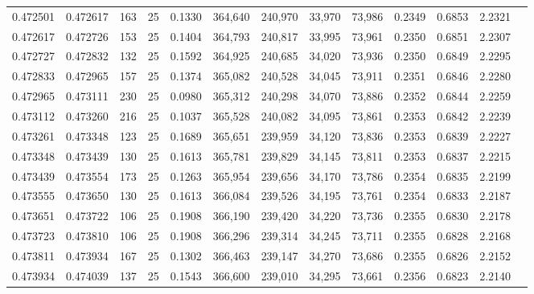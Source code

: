 \begin{tabular}{rrrrrrrrrrrrr}
0.472501 & 0.472617 &   163 &  25 &                                     0.1330 & 364,640 & 240,970 &  33,970 &  73,986 & 0.2349 & 0.6853 & 2.2321 \\
0.472617 & 0.472726 &   153 &  25 &                                     0.1404 & 364,793 & 240,817 &  33,995 &  73,961 & 0.2350 & 0.6851 & 2.2307 \\
0.472727 & 0.472832 &   132 &  25 &                                     0.1592 & 364,925 & 240,685 &  34,020 &  73,936 & 0.2350 & 0.6849 & 2.2295 \\
0.472833 & 0.472965 &   157 &  25 &                                     0.1374 & 365,082 & 240,528 &  34,045 &  73,911 & 0.2351 & 0.6846 & 2.2280 \\
0.472965 & 0.473111 &   230 &  25 &                                     0.0980 & 365,312 & 240,298 &  34,070 &  73,886 & 0.2352 & 0.6844 & 2.2259 \\
0.473112 & 0.473260 &   216 &  25 &                                     0.1037 & 365,528 & 240,082 &  34,095 &  73,861 & 0.2353 & 0.6842 & 2.2239 \\
0.473261 & 0.473348 &   123 &  25 &                                     0.1689 & 365,651 & 239,959 &  34,120 &  73,836 & 0.2353 & 0.6839 & 2.2227 \\
0.473348 & 0.473439 &   130 &  25 &                                     0.1613 & 365,781 & 239,829 &  34,145 &  73,811 & 0.2353 & 0.6837 & 2.2215 \\
0.473439 & 0.473554 &   173 &  25 &                                     0.1263 & 365,954 & 239,656 &  34,170 &  73,786 & 0.2354 & 0.6835 & 2.2199 \\
0.473555 & 0.473650 &   130 &  25 &                                     0.1613 & 366,084 & 239,526 &  34,195 &  73,761 & 0.2354 & 0.6833 & 2.2187 \\
0.473651 & 0.473722 &   106 &  25 &                                     0.1908 & 366,190 & 239,420 &  34,220 &  73,736 & 0.2355 & 0.6830 & 2.2178 \\
0.473723 & 0.473810 &   106 &  25 &                                     0.1908 & 366,296 & 239,314 &  34,245 &  73,711 & 0.2355 & 0.6828 & 2.2168 \\
0.473811 & 0.473934 &   167 &  25 &                                     0.1302 & 366,463 & 239,147 &  34,270 &  73,686 & 0.2355 & 0.6826 & 2.2152 \\
0.473934 & 0.474039 &   137 &  25 &                                     0.1543 & 366,600 & 239,010 &  34,295 &  73,661 & 0.2356 & 0.6823 & 2.2140 \\

\end{tabular}
